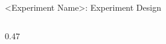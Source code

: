 \begin{frame}[fragile]{<Experiment Name>: Experiment Design}
\begin{columns}[T]
\begin{column}{0.47\textwidth}

\end{column}
\end{columns}
\end{frame}



